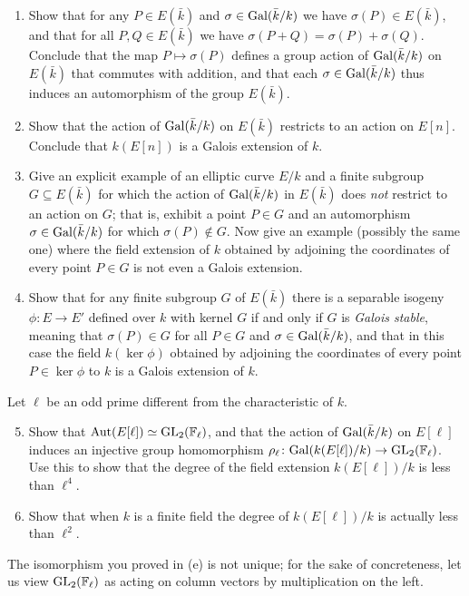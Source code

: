 \documentclass[11pt]{article}
\newcommand{\Fl}{\mathbb{F}_\ell}
\newcommand{\Aut}{{\rm Aut}}
\newcommand{\Gal}{{\rm Gal}}
\newcommand{\GL}{{\rm GL}}
\newcommand{\kbar}{\bar{k}}
\begin{document}
\begin{enumerate}[{\bf (a)}]
\item Show that for any $P\in E(\kbar)$ and $\sigma\in \Gal(\kbar/k)$ we have $\sigma(P)\in E(\kbar)$, and  that for all $P,Q\in E(\kbar)$ we have $\sigma(P+Q)=\sigma(P)+\sigma(Q)$.
Conclude that the map $P\mapsto \sigma(P)$ defines a group action of $\Gal(\kbar/k)$ on $E(\kbar)$ that commutes with addition, and that each $\sigma\in \Gal(\kbar/k)$ thus induces an automorphism of the group $E(\kbar)$.
\item Show that the action of $\Gal(\kbar/k)$ on $E(\kbar)$ restricts to an action on $E[n]$.  Conclude that $k(E[n])$ is a Galois extension of $k$.
\item Give an explicit example of an elliptic curve $E/k$ and a finite subgroup $G\subseteq E(\kbar)$ for which the action of $\Gal(\kbar/k)$ in $E(\kbar)$ does \emph{not} restrict to an action on $G$; that is, exhibit a point $P\in G$ and an automorphism $\sigma\in\Gal(\kbar/k)$ for which $\sigma(P)\not\in G$.
Now give an example (possibly the same one) where the field extension of $k$ obtained by adjoining the coordinates of every point $P\in G$ is not even a Galois extension.
\item Show that for any finite subgroup $G$ of $E(\kbar)$ there is a separable isogeny $\phi\colon E\to E'$ defined over $k$ with kernel $G$ if and only if $G$ is \emph{Galois stable}, meaning that $\sigma(P)\in G$ for all $P\in G$ and $\sigma\in \Gal(\kbar/k)$, and that in this case the field $k(\ker \phi)$ obtained by adjoining the coordinates of every point $P\in \ker\phi$  to $k$ is a Galois extension of $k$.
\end{enumerate}

\noindent
Let $\ell$ be an odd prime different from the characteristic of $k$.

\begin{enumerate}[{\bf(a)}]
\setcounter{enumi}{4}
\item Show that $\Aut(E[\ell])\simeq \GL_2(\Fl)$, and that the action of $\Gal(\kbar/k)$ on $E[\ell]$ induces an injective group homomorphism $\rho_\ell\colon \Gal(k(E[\ell])/k)\to \GL_2(\Fl)$.
Use this to show that the degree of the field extension $k(E[\ell])/k$ is less than $\ell^4$.
\item Show that when $k$ is a finite field the degree of $k(E[\ell])/k$ is actually less than $\ell^2$.
\end{enumerate}

The isomorphism you proved in (e) is not unique; for the sake of concreteness, let us view $\GL_2(\Fl)$ as acting on column vectors by multiplication on the left.
\end{document}
